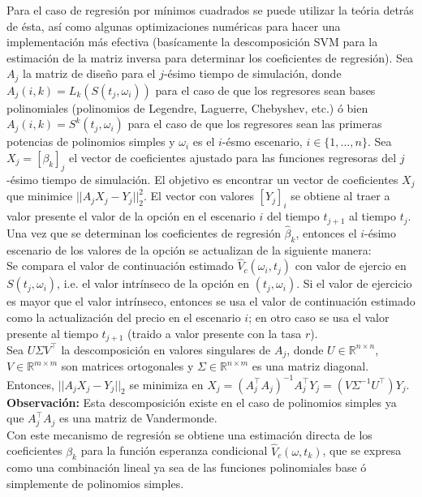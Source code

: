\documentclass[11pt]{article}
\begin{document}
Para el caso de regresión por mínimos cuadrados se puede utilizar la teória detrás de ésta, así como algunas optimizaciones numéricas para hacer una implementación más efectiva (basícamente la descomposición SVM para la estimación de la matriz inversa para determinar los coeficientes de regresión). Sea $A_j$ la matriz de diseño para el $j$-ésimo tiempo de simulación, donde $A_j(i,k) = L_k(S(t_j,\omega_i))$ para el caso de que los regresores sean bases polinomiales (polinomios de Legendre, Laguerre, Chebyshev, etc.) ó bien $A_j(i,k) = S^k(t_j,\omega_i)$ para el caso de que los regresores sean las primeras potencias de polinomios simples y $\omega_i$ es el $i$-ésmo escenario, $i\in\{1,\ldots,n\}$. Sea $X_j = [\beta_k]_j$ el vector de coeficientes ajustado para las funciones regresoras del $j$-ésimo tiempo de simulación. El objetivo es encontrar un vector de coeficientes $X_j$ que minimice $||A_jX_j - Y_j||^2_2$. El vector con valores $[Y_j]_i$ se obtiene al traer a valor presente el valor de la opción en el escenario $i$ del tiempo $t_{j+1}$ al tiempo $t_j$. Una vez que se determinan los coeficientes de regresión $\hat{\beta}_k$, entonces el $i$-ésimo escenario de los valores de la opción se actualizan de la siguiente manera:\\

Se compara el valor de continuación estimado $\hat{V}_c(\omega_i,t_j)$ con valor de ejercio en $S(t_j,\omega_i)$, i.e. el valor intrínseco de la opción en $(t_j,\omega_i)$. Si el valor de ejercicio es mayor que el valor intrínseco, entonces se usa el valor de continuación estimado como la actualización del precio en el escenario $i$; en otro caso se usa el valor presente al tiempo $t_{j+1}$ (traido a valor presente con la tasa $r$).\\

Sea $U\Sigma V^{\top}$ la descomposición en valores singulares de $A_j$, donde $U\in\mathbb{R}^{n\times n}$, $V\in\mathbb{R}^{m\times m}$ son matrices ortogonales y $\Sigma\in\mathbb{R}^{n\times m}$ es una matriz diagonal. Entonces, $||A_jX_j - Y_j||_2$ se minimiza en $X_j = (A_j^{\top}A_j)^{-1}A_j^{\top}Y_j = (V\Sigma^{-1}U^{\top})Y_j$.\\

\textbf{Observación:} Esta descomposición existe en el caso de polinomios simples ya que $A_j^{\top}A_j$ es una matriz de Vandermonde.\\

Con este mecanismo de regresión se obtiene una estimación directa de los coeficientes $\beta_k$ para la función esperanza condicional $\hat{V}_c(\omega,t_k)$, que se expresa como una combinación lineal ya sea de las funciones polinomiales base ó simplemente de polinomios simples.\\
\end{document}
